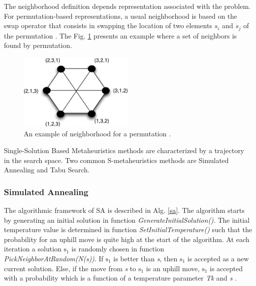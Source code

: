 \documentclass[espaco=umemeio,chapter=TITLE,twoside,openright]{abnt}
\begin{document}
The neighborhood definition depends  representation associated with the problem. For permutation-based representations, a usual neighborhood is based on the swap operator that consists in swapping the location of two elements $s_i$ and $s_j$ of the permutation \cite{Talbi2013}. The Fig. \ref{fig:sperneighborhood} presents an example where a set of neighbors is found by permutation.


\begin{figure}[h]
\centering
\includegraphics[width=0.5\textwidth]{./images/neighborhood.png}
\caption{ An example of neighborhood for a permutation \cite{Talbi2013}.}
\label{fig:sperneighborhood}
\end{figure}



Single-Solution Based Metaheuristics methods are characterized by a trajectory in the search space. Two common S-metaheuristics methods are Simulated Annealing and Tabu Search.

\subsubsection{Simulated Annealing}

The algorithmic framework of SA is described in Alg. \ref{sa}.  The algorithm starts by generating an initial solution in function \textit{GenerateInitialSolution()}. The initial temperature value is determined in function \textit{SetInitialTemperature()} such that the probability for an uphill move is quite high at the start of the algorithm. At each iteration a solution $\mbox{s}_1$ is randomly chosen in function \textit{PickNeighborAtRandom(N(s))}. If \textit{$\mbox{s}_1$} is better than \textit{s}, then \textit{$\mbox{s}_1$} is accepted as a new current solution. Else, if the move from \textit{s} to \textit{$\mbox{s}_1$} is an uphill move, \textit{$\mbox{s}_1$}  is accepted with a probability which is a function of a temperature parameter \textit{Tk} and \textit{s} \cite{raidl2010metaheuristic}.
\end{document}
